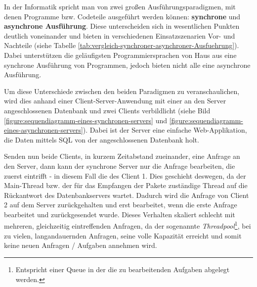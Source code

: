 In der Informatik spricht man von zwei großen Ausführungsparadigmen, mit denen Programme bzw. Codeteile ausgeführt werden können: \textbf{synchrone} und \textbf{asynchrone Ausführung}. Diese unterscheiden sich in wesentlichen Punkten deutlich voneinander und bieten in verschiedenen Einsatzszenarien Vor- und Nachteile (siehe Tabelle \ref{tab:vergleich-synchroner-asynchroner-Ausfuehrung}). Dabei unterstützen die geläufigsten Programmiersprachen von Haus aus eine synchrone Ausführung von Programmen, jedoch bieten nicht alle eine asynchrone Ausführung.

\begin{table}[h]
    \caption{Vergleich zwischen synchroner und asynchroner Ausführung}
    \label{tab:vergleich-synchroner-asynchroner-Ausfuehrung}
\end{table}

Um diese Unterschiede zwischen den beiden Paradigmen zu veranschaulichen, wird dies anhand einer Client-Server-Anwendung mit einer an den Server angeschlossenen Datenbank und zwei Clients verbildlicht (siehe Bild \ref{figure:sequendiagramm-eines-synchronen-servers} und \ref{figure:sequendiagramm-eines-asynchronen-servers}). Dabei ist der Server eine einfache Web-Applikation, die Daten mittels SQL von der angeschlossenen Datenbank holt.

Senden nun beide Clients, in kurzem Zeitabstand zueinander, eine Anfrage an den Server, dann kann der synchrone Server nur die Anfrage bearbeiten, die zuerst eintrifft - in diesem Fall die des Client 1. Dies geschieht deswegen, da der Main-Thread bzw. der für das Empfangen der Pakete zuständige Thread auf die Rückantwort des Datenbankservers wartet. Dadurch wird die Anfrage von Client 2 auf dem Server zurückgehalten und erst bearbeitet, wenn die erste Anfrage bearbeitet und zurückgesendet wurde. Dieses Verhalten skaliert schlecht mit mehreren, gleichzeitig eintreffenden Anfragen, da der sogenannte \textit{Threadpool}\footnote{Entspricht einer Queue in der die zu bearbeitenden Aufgaben abgelegt werden.}, bei zu vielen, langandauernden Anfragen, seine volle Kapazität erreicht und somit keine neuen Anfragen / Aufgaben annehmen wird.

